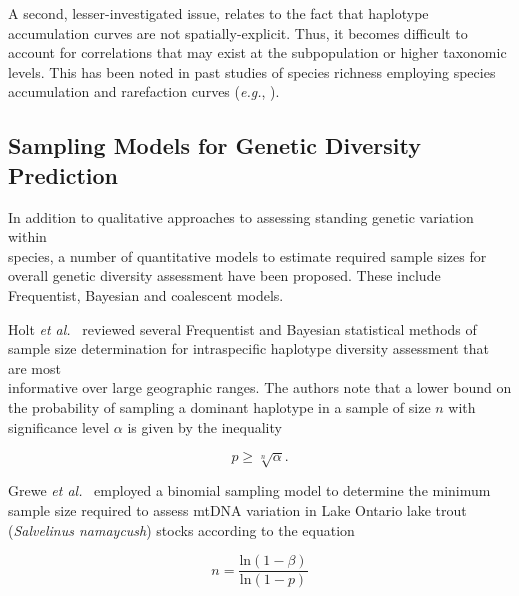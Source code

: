 A second, lesser-investigated issue, relates to the fact that haplotype accumulation curves are not spatially-explicit. Thus, it becomes difficult to account for correlations that may exist at the subpopulation or higher taxonomic levels. This has been noted in past studies of species richness employing species accumulation and rarefaction curves (\textit{e.g.}, \cite{bevilacqua2017approach, chiarucci2009spatially, terlizzi2014species}).



\subsection{Sampling Models for Genetic Diversity Prediction}

In addition to qualitative approaches to assessing standing genetic variation within \\ species, a number of quantitative models to estimate required sample sizes for overall genetic diversity assessment have been proposed. These include Frequentist, Bayesian and coalescent models.



Holt \textit{et al.}~\cite{holt2007experimental} reviewed several Frequentist and Bayesian statistical methods of sample size determination for intraspecific haplotype diversity assessment that are most \\ informative over large geographic ranges. The authors note that a lower bound on the probability of sampling a dominant haplotype in a sample of size $n$ with significance level $\alpha$ is given by the inequality

\begin{equation}
p \geq \sqrt[n]{\alpha}.
\end{equation}



Grewe \textit{et al.}~\cite{grewe1993mitochondrial} employed a binomial sampling model to determine the minimum sample size required to assess mtDNA variation in Lake Ontario lake trout (\textit{Salvelinus namaycush}) stocks according to the equation

\begin{equation}
n=\frac{\textrm{ln}(1 - \beta)}{\textrm{ln}(1 - p)}
\end{equation}



